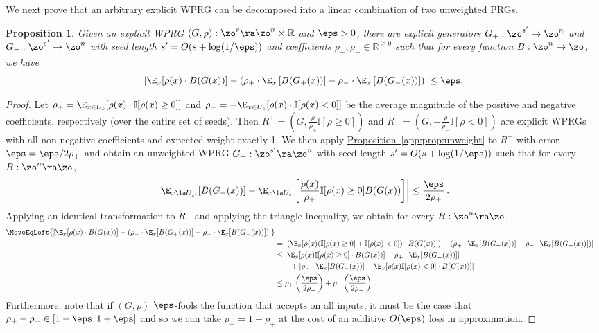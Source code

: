 \documentclass[11pt]{article}
\newcommand{\expref}[2]{\texorpdfstring{\hyperref[#2]{#1~\ref{#2}}}{#1~\ref{#2}}}
\newtheorem{proposition}[theorem]{Proposition}
\newcommand{\R}{{\mathbb R}}
\begin{document}
We next prove that an arbitrary explicit WPRG can be decomposed into a linear combination of two unweighted PRGs. %
\begin{proposition}
Given an explicit WPRG $(G,\rho) : \zo^s \ra \zo^n\times \R$ and $\eps>0$, there are 
explicit generators $G_+ : \zo^{s'}\rightarrow \zo^n$ and $G_- : \zo^{s'}\rightarrow \zo^n$ with seed length
$s'=O(s+\log(1/\eps))$ and coefficients $\rho_+,\rho_-\in \R^{\geq 0}$ such that for every function $B : \zo^n\rightarrow \zo$, we have %
\[\left|\E_x[\rho(x)\cdot B(G(x))] - \left( 
\rho_+\cdot \E_x\left[B(G_+(x))\right] - \rho_-\cdot \E_x\left[B(G_-(x))\right]\right)\right|\leq \eps.\]
\end{proposition}
\begin{proof}
Let $\rho_+=\E_{x\in U_s}[\rho(x)\cdot \mathbb{I}[\rho(x)\geq 0]]$ and $\rho_-=-\E_{x\in U_s}[\rho(x)\cdot \mathbb{I}[\rho(x)< 0]]$ be the average magnitude of the positive and negative coefficients,
%
respectively (over the entire set of seeds). Then $R^+=(G,\frac{\rho}{\rho_+}\mathbb{I}[\rho \geq 0])$ and $R^-=(G,-\frac{\rho}{\rho_-}\mathbb{I}[\rho< 0])$ are explicit WPRGs with all non-negative coefficients and expected weight exactly 1. We then apply \expref{Proposition}{app:prop:unweight} to $R^+$ with error $\eps=\eps/2\rho_+$ and obtain an unweighted WPRG $G_+:\zo^{s'}\ra\zo^n$ with seed length $s'=O(s+\log(1/\eps))$ such that for every $B:\zo^n\ra\zo$,
\[\left|\E_{x\la U_{s'}}[B(G_+(x))] - \E_{x\la U_{s}}\left[\frac{\rho(x)}{\rho_+}\mathbb{I}[\rho(x)\geq 0]B(G(x))\right]
\right|\leq \frac{\eps}{2\rho_+}\,.\] %
Applying an identical transformation to $R^-$ and applying the triangle inequality, we obtain for every $B:\zo^n\ra\zo$,
\begin{align*}
%
    \MoveEqLeft{\left|\E_x[\rho(x)\cdot B(G(x))] - \left(\rho_+ \cdot \E_x[B(G_+(x))]-\rho_-\cdot \E_x[B(G_-(x))]\right)\right|}\\ 
    &= \left|\left(\E_x[\rho(x)(\mathbb{I}[\rho(x)\geq 0]+\mathbb{I}[\rho(x)< 0])\cdot B(G(x))] \right)-\left( \rho_+ \cdot \E_x[B(G_+(x))]-\rho_-\cdot \E_x[B(G_-(x))] \right)\right|\\
    &\leq \left|\E_x[\rho(x)\mathbb{I}[\rho(x)\geq 0]\cdot B(G(x))]- \rho_+ \cdot \E_x[B(G_+(x))]\right| \\
%
%
    &\qquad +\left|\rho_-\cdot \E_x[B(G_-(x))]-\E_x[\rho(x)\mathbb{I}[\rho(x)< 0]\cdot B(G(x))]\right|\\
    &\leq \rho_+\left(\frac{\eps}{2\rho_+}\right)+\rho_-\left(\frac{\eps}{2\rho_-}\right)\,.
\end{align*}
%
Furthermore, note that if $(G,\rho)$ $\eps$-fools the function that accepts on all inputs, it must be the case that $\rho_+-\rho_-\in [1- \eps,1+\eps]$ and so we can take $\rho_-=1-\rho_+$ at the cost of an additive $O(\eps)$ loss in approximation.
\end{proof}
\end{document}

